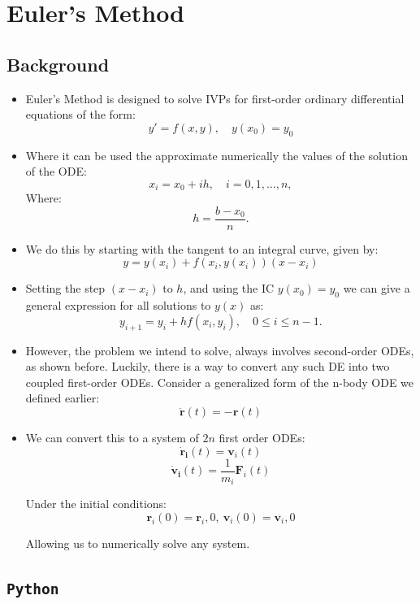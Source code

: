 \documentclass[11pt]{article}
\newcommand{\psubsection}[1]{{\section*{\LARGE #1}}}
\newcommand{\psubsubsection}[1]{{\subsection*{#1}}}
\begin{document}
    \psubsection{Euler's Method}
    \psubsubsection{Background}
    \begin{itemize}
        \item Euler's Method is designed to solve IVPs for first-order ordinary differential equations of the form:
        \[ \label{eq:3.1.1} y'=f(x,y),\quad y(x_0)=y_0 \]
        \item Where it can be used the approximate numerically the values of the solution of the ODE:
        \[ x_i=x_0+ih,\quad i=0,1, \dots,n, \nonumber \]
        \noindent
        Where:
        \[ h={\frac{b-x_0}{n}}.\nonumber \]

        \item We do this by starting with the tangent to an integral curve, given by:
        \[ \label{eq:3.1.2} y=y(x_i)+f(x_i,y(x_i))(x-x_i) \]

        \item Setting the step $(x-x_i)$ to $h$, and using the IC $y(x_0) = y_0$ we can give a general expression for all solutions to $y(x)$ as:
        \[ \label{eq:3.1.4} y_{i+1}=y_i+hf(x_i,y_i),\quad 0\le i\le n-1. \]

        \item However, the problem we intend to solve, always involves second-order ODEs, as shown before. Luckily, there is a way to convert any such DE into two coupled first-order ODEs. Consider a generalized form of the n-body ODE we defined earlier:
        \[  \mathbf{\ddot{r}}(t) = -\mathbf{r}(t) \]

        \item We can convert this to a system of $2n$ first order ODEs:
        \[ \mathbf{\dot{r}_i}(t) = \mathbf{v}_i(t) \]
        \[ \mathbf{\dot{v}_i}(t) = \frac{1}{m_i}\mathbf{F}_i(t) \]

        Under the initial conditions:
        \[ \mathbf{r}_i(0) = \mathbf{r}_i,0, \ \mathbf{v}_i(0) = \mathbf{v}_i,0 \]

        Allowing us to numerically solve any system.
    \end{itemize}
    
    \psubsubsection{\texttt{Python}}
\end{document}

